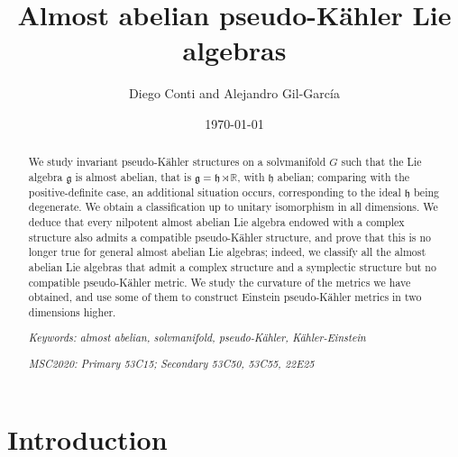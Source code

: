 \documentclass{article}
\title{\textbf{Almost abelian pseudo-Kähler Lie algebras}}
\author{Diego Conti \orcidlink{0000-0001-6812-4411} and Alejandro Gil-García \orcidlink{0000-0002-9370-241X}}
\date{\today}
\theoremstyle{definition}
\begin{document}
\maketitle

\begin{abstract}

We study invariant pseudo-Kähler structures on a solvmanifold $G$ such that the Lie algebra $\mathfrak{g}$ is almost abelian, that is $\mathfrak{g}=\mathfrak{h}\rtimes\mathbb{R}$, with $\mathfrak{h}$ abelian; comparing with the positive-definite case, an additional situation occurs, corresponding to the ideal $\mathfrak{h}$ being degenerate. We obtain a classification up to unitary isomorphism in all dimensions. We deduce that every nilpotent almost abelian Lie algebra endowed with a complex structure also admits a compatible pseudo-Kähler structure, and prove that this is no longer true for general almost abelian Lie algebras; indeed, we classify all the almost abelian Lie algebras that admit a complex structure and a symplectic structure but no compatible pseudo-Kähler metric. We study the curvature of the metrics we have obtained, and use some of them to construct Einstein pseudo-Kähler metrics in two dimensions higher.\bigskip

\emph{Keywords: almost abelian, solvmanifold, pseudo-Kähler, Kähler-Einstein}\medskip

\emph{MSC2020: Primary 53C15; Secondary 53C50, 53C55, 22E25}

\end{abstract}

\clearpage

\tableofcontents


\section*{Introduction}
\end{document}
